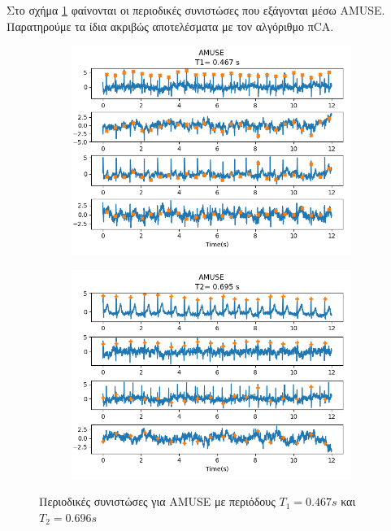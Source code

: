 %
\noindent Στο σχήμα \ref{fig:5.25} φαίνονται οι περιοδικές συνιστώσες που εξάγονται μέσω \en AMUSE. \gr Παρατηρούμε τα ίδια ακριβώς αποτελέσματα με τον αλγόριθμο π\en CA. \gr
\begin{figure}[H] 
    \centering
    \begin{subfigure}{0.48 \textwidth}
        \centering
        \includegraphics[width=\textwidth]{r01database/amuse_infant.png}\en
    \end{subfigure}
    \hfill
    \begin{subfigure}{0.48 \textwidth}
        \centering
        \includegraphics[width=\textwidth]{r01database/amuse_mother.png}\en
    \end{subfigure}
    \gr
    \caption{Περιοδικές συνιστώσες για \en AMUSE \gr με περιόδους \en $Τ_1 = 0.467 s$ \gr και \en $Τ_2 = 0.696 s$ \gr  }
    \label{fig:5.25}
\end{figure} 

